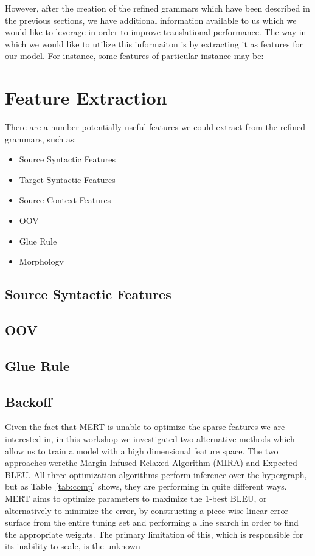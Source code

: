 However, after the creation of the refined grammars which have been described in the previous sections, we have additional information available to us which we would like to leverage in order to improve translational performance. The way in which we would like to utilize this informaiton is by extracting it as features for our model. For instance, some features of particular instance may be:

\section{Feature Extraction}
There are a number potentially useful features we could extract from the refined grammars, such as:
\begin{itemize}
\item Source Syntactic Features
\item Target Syntactic Features
\item Source Context Features
\item OOV
\item Glue Rule
\item Morphology
\end{itemize}


\subsection{Source Syntactic Features}
\subsection{OOV}
\subsection{Glue Rule}
\subsection{Backoff}

Given the fact that MERT is unable to optimize the sparse features we are interested in, in this workshop we investigated two alternative methods which allow us to train a model with a high dimensional feature space. The two approaches werethe Margin Infused Relaxed Algorithm (MIRA) and Expected BLEU. All three optimization algorithms perform inference over the hypergraph, but as Table~\ref{tab:comp} shows, they are performing in quite different ways. MERT aims to optimize parameters to maximize the 1-best BLEU, or alternatively to minimize the error, by constructing a piece-wise linear error surface from the entire tuning set and performing a line search in order to find the appropriate weights. The primary limitation of this, which is responsible for its inability to scale, is the unknown


